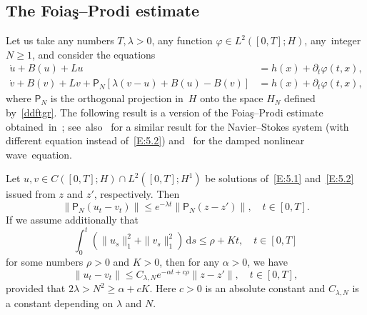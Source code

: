\documentclass[AHL,Unicode,longabstracts]{cedram}
\newcommand{\p}{\partial}
\newcommand{\la}{\lambda}
\newcommand{\pp}{{{\mathsf P}_N}}
\newcommand{\dd}{\mathrm{d}}
\begin{document}
\subsection{The Foia\c{s}--Prodi estimate}

Let us take any numbers $T, \lambda>0$, any function $\varphi \in L^2([0,T]; H)$, any~integer $N\ge1$, and consider the equations
\begin{align}
\dot u+B(u)+Lu &=h(x)+\p_t\varphi(t,x),\label{E:5.1}\\
\dot v+B(v)+Lv+{\mathsf P}_N[\la(v-u)+B(u)-B(v)]&=h(x)+\p_t\varphi(t,x),\label{E:5.2}
\end{align}
where $\pp$ is the orthogonal projection in~$H$ onto the space $H_N$ defined by~\eqref{ddftgr}. The following result is a version of the Foia\c{s}--Prodi estimate obtained~in~\cite{FP-1967}; see~also~\cite[Section~2.1.8]{KS-book} for a similar result for the Navier--Stokes system (with different equation instead of~\eqref{E:5.2}) and~\cite[Section~7.3]{MN-2015} for the damped nonlinear wave~equation.

\begin{prop}\label{4.13}
Let $u,v\in C([0,T];H) \cap L^2([0,T];H^1) $ be solutions of~\eqref{E:5.1} and~\eqref{E:5.2} issued from $z$ and $z'$, respectively. Then
\begin{equation}\label{FPE1}
\|\pp(u_t-v_t)\| \le e^{- \la t}\|\pp(z-z') \|, \quad t\in [0,T].
\end{equation}
If we assume additionally that
\begin{equation}\label{4.17}
\int_0^t(\| u_s\|_1^2+\| v_s\|_1^2)\,\dd s\le \rho+Kt, \quad t\in [0,T]
\end{equation}
for some numbers $\rho>0$ and $K>0$, then for any $\alpha >0$, we have
\begin{equation}\label{4.16}
\|u_t-v_t \|\leq C_{\la,N} e^{-\alpha t+c \rho}\|z-z'\|, \quad t\in [0,T],
\end{equation}
provided that $2\la> N^2\ge \alpha +cK$. Here $c>0$ is an absolute constant and $C_{\la,N}$ is a constant depending on $\la$ and $N$.
\end{prop}
\end{document}
